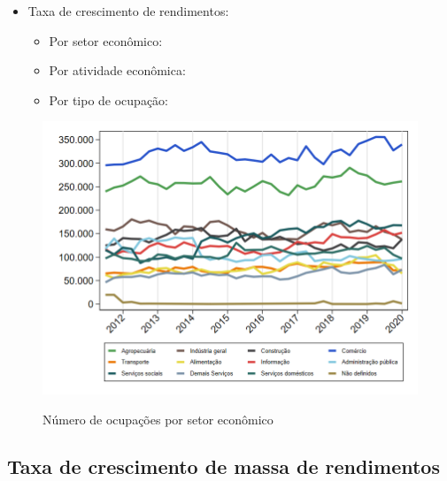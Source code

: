 \documentclass[8pt]{beamer}
\begin{document}
\begin{frame}[label=indice_principal_amz_mt]{}
\begin{itemize}
\item{Taxa de crescimento de rendimentos:
	\begin{itemize}
	\item{Por setor econômico: \hyperlink{amzmtrkngtxrendaporsetor}{}}
	\item{Por atividade econômica: \hyperlink{amzmtrkngtxrendaporatividade}{}}
	\item{Por tipo de ocupação: \hyperlink{amzmtrkngtxrendaporocupacao}{}}
	\end{itemize}
}
\vspace{1mm}

\end{itemize}

\end{frame}

\begin{frame}
\textit{\hyperlink{indice_principal_amz_mt}{}}
\begin{figure}
  \centering
  \includegraphics[width=.85\linewidth]{./../analysis/output/_amz_mt_importancia_relativa.png}
  \label{_amz_mt_importancia_relativa}
  \caption{{Número de ocupações por setor econômico}}
\end{figure}
\end{frame}

\subsection{Taxa de crescimento de massa de rendimentos}

\begin{frame}
\textit{\hyperlink{indice_principal_amz_mt}{}}

\end{frame}
\end{document}
